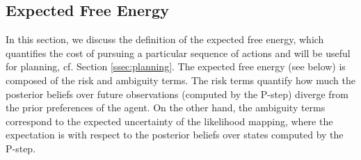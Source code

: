 \documentclass[twoside,11pt]{article}
\begin{document}
\subsection{Expected Free Energy} \label{ssec:efe}

In this section, we discuss the definition of the expected free energy, which quantifies the cost of pursuing a particular sequence of actions and will be useful for planning, cf. Section \ref{ssec:planning}. The expected free energy (see below) is composed of the risk and ambiguity terms. The risk terms quantify how much the posterior beliefs over future observations (computed by the P-step) diverge from the prior preferences of the agent. On the other hand, the ambiguity terms correspond to the expected uncertainty of the likelihood mapping, where the expectation is with respect to the posterior beliefs over states computed by the P-step.
\end{document}
